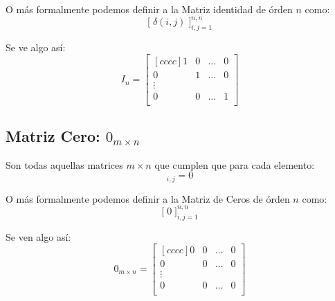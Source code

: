 \documentclass[12pt, fleqn]{report}                             %
\theoremstyle{break}                                            %
\newcommand{\BigBrackets}[1]    {\Big[ \; #1 \; \Big]}          %
\begin{document}
                O más formalmente podemos definir a la Matriz identidad de órden $n$ como:
                \begin{equation*}
                    \BigBrackets{\delta(i,j)}_{i, j = 1}^{n, n}
                \end{equation*}

                Se ve algo así:
                \begin{equation*}
                    I_n =
                    \begin{bmatrix}[cccc]
                        1 & 0 & \dots & 0   \\
                        0 & 1 & \dots & 0   \\
                        \vdots              \\
                        0 & 0 & \dots & 1   \\
                    \end{bmatrix}
                \end{equation*}



            \vspace{2em}
            \subsection{Matriz Cero: $0_{m \times n}$}

                Son todas aquellas matrices $m \times n$ que cumplen que para cada elemento:
                \begin{equation*}
                    [0]_{i,j} = 0
                \end{equation*}

                O más formalmente podemos definir a la Matriz de Ceros de órden $n$ como:
                \begin{equation*}
                    \BigBrackets{0}_{i, j = 1}^{n, n}
                \end{equation*}

                Se ven algo así:
                \begin{equation*}
                    0_{m \times n} =
                    \begin{bmatrix}[cccc]
                        0 & 0 & \dots & 0   \\
                        0 & 0 & \dots & 0   \\
                        \vdots              \\
                        0 & 0 & \dots & 0   \\
                    \end{bmatrix}
                \end{equation*}
\end{document}
